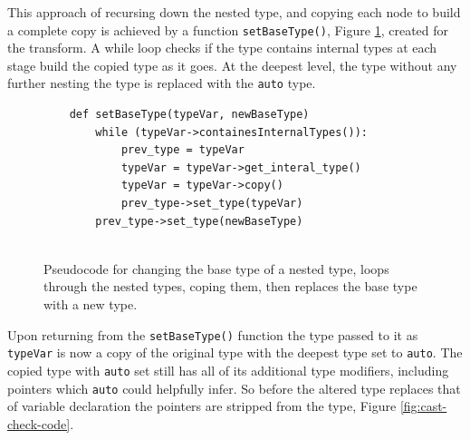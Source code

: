 \documentclass[bsc,frontabs,singlespacing,twoside,parskip,deptreport]{infthesis}
\begin{document}
This approach of recursing down the nested type, and copying each node to build a complete copy is achieved by a function \texttt{setBaseType()}, Figure \ref{fig:code-set-type}, created for the transform. A while loop checks if the type contains internal types at each stage build the copied type as it goes. At the deepest level, the type without any further nesting the type is replaced with the \texttt{auto} type.

\begin{figure}[H]
    \begin{verbatim}
    def setBaseType(typeVar, newBaseType)
        while (typeVar->containesInternalTypes()):
            prev_type = typeVar
            typeVar = typeVar->get_interal_type()
            typeVar = typeVar->copy()
            prev_type->set_type(typeVar)
        prev_type->set_type(newBaseType)    
            
    \end{verbatim}
    \caption{Pseudocode for changing the base type of a nested type, loops through the nested types, coping them, then replaces the base type with a new type.}
    \centering
    \label{fig:code-set-type}
\end{figure}

Upon returning from the \texttt{setBaseType()} function the type passed to it as \texttt{typeVar} is now a copy of the original type with the deepest type set to \texttt{auto}. The copied type with \texttt{auto} set still has all of its additional type modifiers, including pointers which \texttt{auto} could helpfully infer. So before the altered type replaces that of variable declaration the pointers are stripped from the type, Figure \ref{fig:cast-check-code}. 




    
\end{document}
